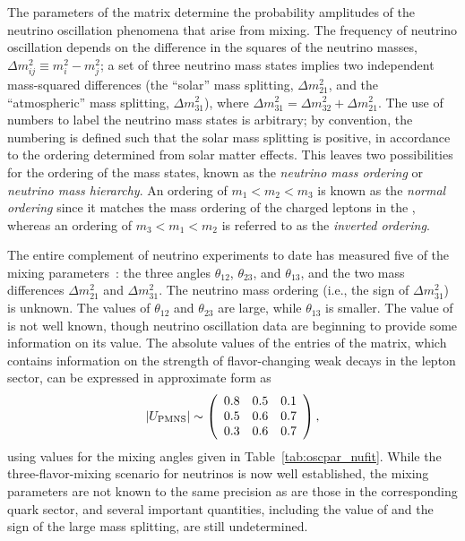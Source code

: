 The parameters of the 
matrix determine the probability amplitudes of the neutrino
oscillation phenomena that arise from mixing.  The frequency of neutrino oscillation 
depends on the difference in the squares of the neutrino
masses, $\Delta m^{2}_{ij} \equiv m^{2}_{i} - m^{2}_{j}$; a set of three
neutrino mass states implies two independent mass-squared differences
(the ``solar'' mass splitting, $\Delta m^{2}_{21}$, and the ``atmospheric'' mass splitting, 
$\Delta m^{2}_{31}$), where $\Delta m^{2}_{31} = \Delta m^{2}_{32} + \Delta m^{2}_{21}$. 
The use of numbers to label the neutrino mass states is arbitrary; by convention, the numbering is defined such that the solar mass splitting is positive, in accordance to the ordering determined from solar matter effects.
This leaves two possibilities for
the ordering of the
mass states, known as the \emph{neutrino mass ordering} or \emph{neutrino mass hierarchy}. An ordering of
$m_1 < m_2 < m_3$ is known as the \emph{normal ordering} since it matches
the mass ordering of the charged leptons in the , whereas an ordering of $m_3 < m_1 < m_2$
is referred to as the \emph{inverted ordering}.

The entire complement of neutrino experiments to date has measured
five of the mixing parameters~\cite{Esteban:2018azc,deSalas:2017kay,Capozzi:2017yic}: the three angles $\theta_{12}$,
$\theta_{23}$, and $\theta_{13}$, and the two mass differences
$\Delta m^{2}_{21}$ and $\Delta m^{2}_{31}$. 
The neutrino mass ordering (i.e., the sign of $\Delta m^{2}_{31}$) is unknown.
The values of $\theta_{12}$ and $\theta_{23}$ are large, while 
$\theta_{13}$ is smaller. The value of \deltacp is not well known, though neutrino oscillation data are beginning to provide some information on its value.
The absolute values of the entries of the  matrix, which
contains information on the strength of flavor-changing weak decays in
the lepton sector, can be expressed in approximate form as
\begin{equation}
|U_{\rm PMNS}|\sim \left(\begin{array}{ccc} 0.8 & 0.5 & 0.1 \\ 0.5 & 0.6 & 0.7 \\ 0.3 & 0.6 & 0.7\end{array} \right),
\label{eq:pmnsmatrix}
\end{equation}
using values for the mixing angles given in Table~\ref{tab:oscpar_nufit}. 
While the three-flavor-mixing scenario for neutrinos is now well
established, the mixing parameters are not known to the same precision 
as are those in the
corresponding quark sector, and several important quantities, including
the value of \deltacp and the sign of the large mass splitting, are
still undetermined.

